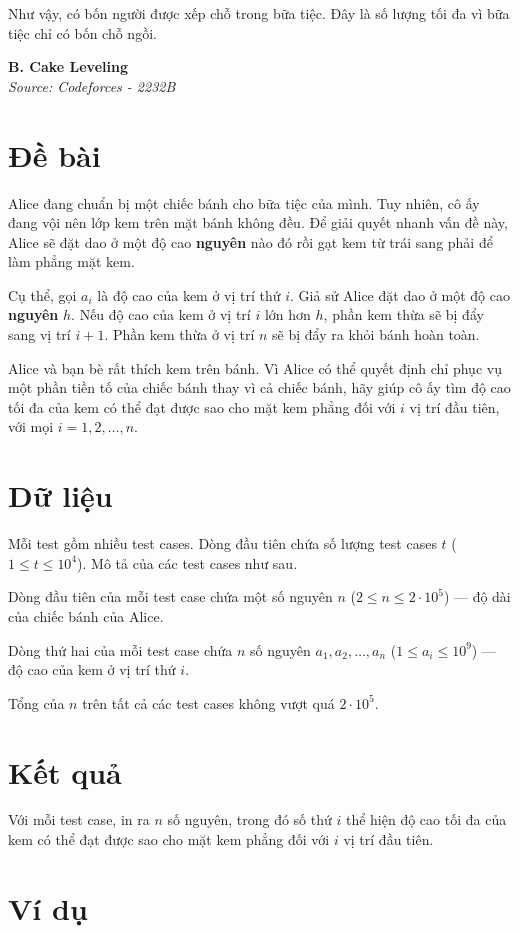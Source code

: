 \documentclass[11pt]{article}
\newcommand{\problem}[2]{
    \begin{problembox}
    \begin{center}
        \Large \textbf{#1} \\
        \vspace{0.2cm}
        \small \textit{Source: #2}
    \end{center}
    \end{problembox}
}
\begin{document}
Như vậy, có bốn người được xếp chỗ trong bữa tiệc. Đây là số lượng tối đa vì bữa tiệc chỉ có bốn chỗ ngồi.

\newpage
\problem{B. Cake Leveling}{Codeforces - 2232B}

\section*{Đề bài}
Alice đang chuẩn bị một chiếc bánh cho bữa tiệc của mình. Tuy nhiên, cô ấy đang vội nên lớp kem trên mặt bánh không đều. Để giải quyết nhanh vấn đề này, Alice sẽ đặt dao ở một độ cao \textbf{nguyên} nào đó rồi gạt kem từ trái sang phải để làm phẳng mặt kem.

Cụ thể, gọi $a_i$ là độ cao của kem ở vị trí thứ $i$. Giả sử Alice đặt dao ở một độ cao \textbf{nguyên} $h$. Nếu độ cao của kem ở vị trí $i$ lớn hơn $h$, phần kem thừa sẽ bị đẩy sang vị trí $i+1$. Phần kem thừa ở vị trí $n$ sẽ bị đẩy ra khỏi bánh hoàn toàn.

Alice và bạn bè rất thích kem trên bánh. Vì Alice có thể quyết định chỉ phục vụ một phần tiền tố của chiếc bánh thay vì cả chiếc bánh, hãy giúp cô ấy tìm độ cao tối đa của kem có thể đạt được sao cho mặt kem phẳng đối với $i$ vị trí đầu tiên, với mọi $i = 1, 2, \ldots, n$.

\section*{Dữ liệu}
Mỗi test gồm nhiều test cases. Dòng đầu tiên chứa số lượng test cases $t$ ($1 \le t \le 10^4$). Mô tả của các test cases như sau.

Dòng đầu tiên của mỗi test case chứa một số nguyên $n$ ($2 \le n \le 2\cdot 10^5$) — độ dài của chiếc bánh của Alice.

Dòng thứ hai của mỗi test case chứa $n$ số nguyên $a_1, a_2, \ldots, a_n$ ($1 \le a_i \le 10^9$) — độ cao của kem ở vị trí thứ $i$.

Tổng của $n$ trên tất cả các test cases không vượt quá $2 \cdot 10^5$.

\section*{Kết quả}
Với mỗi test case, in ra $n$ số nguyên, trong đó số thứ $i$ thể hiện độ cao tối đa của kem có thể đạt được sao cho mặt kem phẳng đối với $i$ vị trí đầu tiên.

\section*{Ví dụ}
\end{document}
